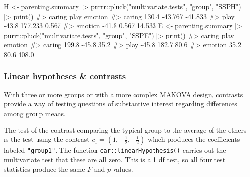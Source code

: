\documentclass[
  letterpaper,
  10pt,
  krantz2]{krantz}
\makeatletter
\newenvironment{Shaded}{\begin{snugshade}}{\end{snugshade}}
\newcommand{\CommentTok}[1]{\textcolor[rgb]{0.37,0.37,0.37}{#1}}
\newcommand{\FunctionTok}[1]{\textcolor[rgb]{0.28,0.35,0.67}{#1}}
\newcommand{\NormalTok}[1]{\textcolor[rgb]{0.00,0.23,0.31}{#1}}
\newcommand{\OtherTok}[1]{\textcolor[rgb]{0.00,0.23,0.31}{#1}}
\newcommand{\SpecialCharTok}[1]{\textcolor[rgb]{0.37,0.37,0.37}{#1}}
\newcommand{\StringTok}[1]{\textcolor[rgb]{0.13,0.47,0.30}{#1}}
\newenvironment{kframe}{%
  \medskip{}
  \setlength{\fboxsep}{.8em}
  \def\at@end@of@kframe{}%
  \ifinner\ifhmode%
  \def\at@end@of@kframe{\end{minipage}}%
  \begin{minipage}{\columnwidth}%
  \fi\fi%
  \def\FrameCommand##1{\hskip\@totalleftmargin \hskip-\fboxsep
  \colorbox{shadecolor}{##1}\hskip-\fboxsep
      \hskip-\linewidth \hskip-\@totalleftmargin \hskip\columnwidth}%
  \MakeFramed {\advance\hsize-\width
    \@totalleftmargin\z@ \linewidth\hsize
    \@setminipage}}%
{\par\unskip\endMakeFramed%
  \at@end@of@kframe}
\renewenvironment{Shaded}{\begin{kframe}}{\end{kframe}}
\makeatother
\begin{document}
\begin{Shaded}
\begin{Highlighting}[]
\NormalTok{H }\OtherTok{\textless{}{-}}\NormalTok{ parenting.summary }\SpecialCharTok{|\textgreater{}} 
\NormalTok{  purrr}\SpecialCharTok{::}\FunctionTok{pluck}\NormalTok{(}\StringTok{"multivariate.tests"}\NormalTok{, }\StringTok{"group"}\NormalTok{, }\StringTok{"SSPH"}\NormalTok{) }\SpecialCharTok{|\textgreater{}} 
  \FunctionTok{print}\NormalTok{()}
\CommentTok{\#\textgreater{}         caring    play emotion}
\CommentTok{\#\textgreater{} caring   130.4 {-}43.767 {-}41.833}
\CommentTok{\#\textgreater{} play     {-}43.8 177.233   0.567}
\CommentTok{\#\textgreater{} emotion  {-}41.8   0.567  14.533}
\NormalTok{E }\OtherTok{\textless{}{-}}\NormalTok{ parenting.summary }\SpecialCharTok{|\textgreater{}} 
\NormalTok{  purrr}\SpecialCharTok{::}\FunctionTok{pluck}\NormalTok{(}\StringTok{"multivariate.tests"}\NormalTok{, }\StringTok{"group"}\NormalTok{, }\StringTok{"SSPE"}\NormalTok{) }\SpecialCharTok{|\textgreater{}} 
  \FunctionTok{print}\NormalTok{()}
\CommentTok{\#\textgreater{}         caring  play emotion}
\CommentTok{\#\textgreater{} caring   199.8 {-}45.8    35.2}
\CommentTok{\#\textgreater{} play     {-}45.8 182.7    80.6}
\CommentTok{\#\textgreater{} emotion   35.2  80.6   408.0}
\end{Highlighting}
\end{Shaded}

\subsubsection*{Linear hypotheses \&
contrasts}\label{linear-hypotheses-contrasts}

With three or more groups or with a more complex MANOVA design,
contrasts provide a way of testing questions of substantive interest
regarding differences among group means.

The test of the contrast comparing the typical group to the average of
the others is the test using the contrast
\(c_1 = (1, -\frac12, -\frac12)\) which produces the coefficients
labeled \texttt{"group1"}. The function \texttt{car::linearHypothesis()}
carries out the multivariate test that these are all zero. This is a 1
df test, so all four test statistics produce the same \(F\) and
\(p\)-values.
\end{document}
